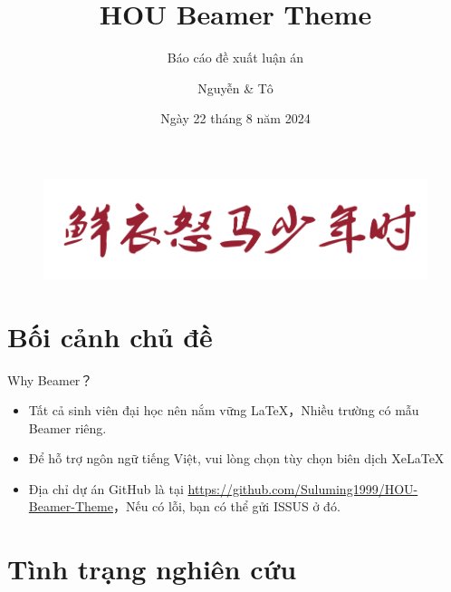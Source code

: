 \documentclass{beamer}
\author{Nguyễn \& Tô}
\title{HOU Beamer Theme}
\subtitle{Báo cáo đề xuất luận án}
\institute{Trường Đại học Mở Hà Nội}
\date{Ngày 22 tháng 8 năm 2024}
\begin{document}
\kaishu
\begin{frame}
    \titlepage
    \begin{figure}[htpb]
        \begin{center}
            \includegraphics[width=0.4\linewidth]{pic/1.png}
        \end{center}
    \end{figure}
\end{frame}

\begin{frame}
    \tableofcontents[sectionstyle=show,subsectionstyle=show/shaded/hide,subsubsectionstyle=show/shaded/hide]
\end{frame}


\section{Bối cảnh chủ đề} %

\begin{frame}{Why Beamer？}
    \begin{itemize}[<+-| alert@+>] %
        \item Tất cả sinh viên đại học nên nắm vững \LaTeX{}，Nhiều trường có mẫu Beamer riêng.
        \item Để hỗ trợ ngôn ngữ tiếng Việt, vui lòng chọn tùy chọn biên dịch Xe\LaTeX{}
        \item Địa chỉ dự án GitHub là tại \url{https://github.com/Suluming1999/HOU-Beamer-Theme}，Nếu có lỗi, bạn có thể gửi ISSUS ở đó.
    \end{itemize}
\end{frame}

\section{Tình trạng nghiên cứu} %
\end{document}
